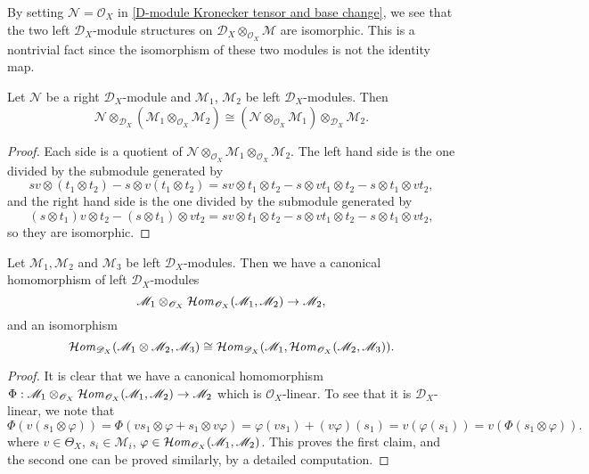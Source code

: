 \begin{remark}
By setting $\mathscr{N}=\mathscr{O}_X$ in \cref{D-module Kronecker tensor and base change}, we see that the two left $\mathscr{D}_X$-module structures on $\mathscr{D}_X\otimes_{\mathscr{O}_X}\mathscr{M}$ are isomorphic. This is a nontrivial fact since the isomorphism of these two modules is not the identity map.
\end{remark}

\begin{proposition}\label{D-module tensor with Kronecker tensor isomorphism}
Let $\mathscr{N}$ be a right $\mathscr{D}_X$-module and $\mathscr{M}_1$, $\mathscr{M}_2$ be left $\mathscr{D}_X$-modules. Then
\[\mathscr{N}\otimes_{\mathscr{D}_X}(\mathscr{M}_1\otimes_{\mathscr{O}_X}\mathscr{M}_2)\cong (\mathscr{N}\otimes_{\mathscr{O}_X}\mathscr{M}_1)\otimes_{\mathscr{D}_X}\mathscr{M}_2.\]
\end{proposition}
\begin{proof}
Each side is a quotient of $\mathscr{N}\otimes_{\mathscr{O}_X}\mathscr{M}_1\otimes_{\mathscr{O}_X}\mathscr{M}_2$. The left hand side is the one divided by the submodule generated by
\[sv\otimes (t_1\otimes t_2)-s\otimes v(t_1\otimes t_2)=sv\otimes t_1\otimes t_2-s\otimes vt_1\otimes t_2-s\otimes t_1\otimes vt_2,\]
and the right hand side is the one divided by the submodule generated by
\[(s\otimes t_1)v\otimes t_2-(s\otimes t_1)\otimes vt_2=sv\otimes t_1\otimes t_2-s\otimes vt_1\otimes t_2-s\otimes t_1\otimes vt_2,\]
so they are isomorphic.
\end{proof}

\begin{proposition}\label{D-module Hom and Kronecker tensor prop}
Let $\mathscr{M}_1,\mathscr{M}_2$ and $\mathscr{M}_3$ be left $\mathscr{D}_X$-modules. Then we have a canonical homomorphism of left $\mathscr{D}_X$-modules
\[\mathscr{M}_1\otimes_{\mathscr{O}_X}\operatorname{\mathcal{H}\hspace*{-0.4pt}\textit{om}\hspace{0.5pt}}_{\mathscr{O}_X}(\mathscr{M}_1,\mathscr{M}_2)\to\mathscr{M}_2,\]
and an isomorphism
\begin{equation}\label{D-module Hom and Kronecker tensor prop-1}
\operatorname{\mathcal{H}\hspace*{-0.4pt}\textit{om}\hspace{0.5pt}}_{\mathscr{D}_X}(\mathscr{M}_1\otimes\mathscr{M}_2,\mathscr{M}_3)\cong\operatorname{\mathcal{H}\hspace*{-0.4pt}\textit{om}\hspace{0.5pt}}_{\mathscr{D}_X}(\mathscr{M}_1,\operatorname{\mathcal{H}\hspace*{-0.4pt}\textit{om}\hspace{0.5pt}}_{\mathscr{O}_X}(\mathscr{M}_2,\mathscr{M}_3)).
\end{equation}
\end{proposition}
\begin{proof}
It is clear that we have a canonical homomorphism $\Phi:\mathscr{M}_1\otimes_{\mathscr{O}_X}\operatorname{\mathcal{H}\hspace*{-0.4pt}\textit{om}\hspace{0.5pt}}_{\mathscr{O}_X}(\mathscr{M}_1,\mathscr{M}_2)\to\mathscr{M}_2$ which is $\mathscr{O}_X$-linear. To see that it is $\mathscr{D}_X$-linear, we note that
\[\Phi(v(s_1\otimes\varphi))=\Phi(vs_1\otimes\varphi+s_1\otimes v\varphi)=\varphi(vs_1)+(v\varphi)(s_1)=v(\varphi(s_1))=v(\Phi(s_1\otimes\varphi)).\]
where $v\in\Theta_X$, $s_i\in\mathscr{M}_i$, $\varphi\in\operatorname{\mathcal{H}\hspace*{-0.4pt}\textit{om}\hspace{0.5pt}}_{\mathscr{O}_X}(\mathscr{M}_1,\mathscr{M}_2)$. This proves the first claim, and the second one can be proved similarly, by a detailed computation.
\end{proof}

